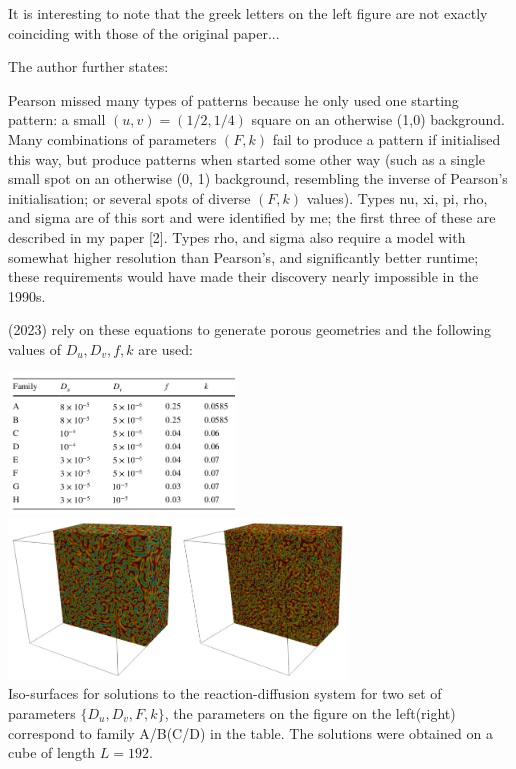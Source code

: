It is interesting to note that the greek letters on the left figure are
not exactly coinciding with those of the original paper...

The author further states:
\begin{displayquote}
{\color{darkgray}
Pearson missed many types of patterns because he only used one starting pattern: 
a small $(u,v)=(1/2,1/4)$ square on an otherwise (1,0) background. Many combinations 
of parameters $(F,k)$ fail to produce 
a pattern if initialised this way, but produce patterns when started some other way 
(such as a single small spot on 
an otherwise (0, 1) background, resembling the inverse of Pearson's initialisation; or several spots of
diverse $(F,k)$ values). 
Types nu, xi, pi, rho, and sigma are of this sort and were identified by me; 
the first three of these are described in my paper [2]. 
Types rho, and sigma also require a model with somewhat higher 
resolution than Pearson's, and significantly better runtime; these requirements would have made their discovery 
nearly impossible in the 1990s.
}
\end{displayquote} 




\textcite{gama23} (2023) rely on these equations to generate porous geometries 
and the following values of $D_u,D_v,f,k$ are used:

\begin{center}
\includegraphics[width=6cm]{python_codes/fieldstone_171/images/gama01}
\includegraphics[width=9cm]{python_codes/fieldstone_171/images/gama02}\\
{\captionfont Iso-surfaces for solutions to the reaction-diffusion system 
for two set of parameters $\{D_u,D_v,F,k\}$, the parameters on the figure on 
the left(right) correspond to family A/B(C/D) in the table. The solutions were
obtained on a cube of length $L=192$.}
\end{center}

